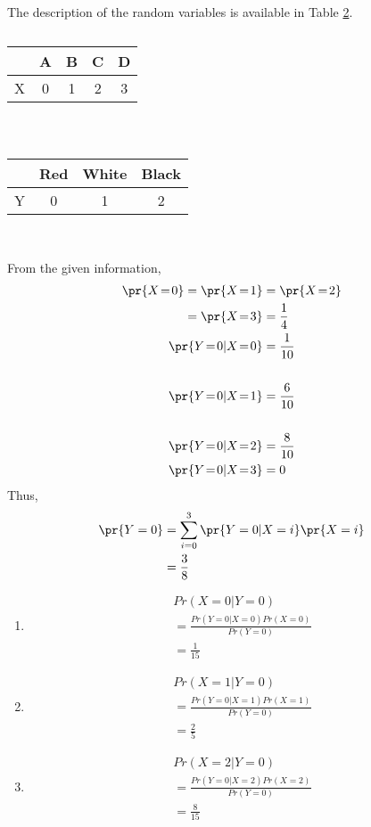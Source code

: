 The description of the random variables is available in Table \ref{table:2.2}.
\begin{table}[!ht]
\centering
\begin{tabular}{|c|c|c|c|c|}
\hline
     &A&B&C&D  \\
     \hline
     X&0&1&2&3\\
     \hline
\end{tabular}\\[5pt]
\begin{tabular}{|c|c|c|c|}
\hline
     &Red&White&Black  \\
     \hline
     Y&0&1&2\\
     \hline
\end{tabular}\\[5pt]
\caption{}
\label{table:2.2}
\end{table}
From the given information,
\begin{align}
\pr{X\!=\!0} = \pr{X\!=\!1} &= \pr{X\!=\!2} 
\\
= \pr{X\!=\!3} &= \frac{1}{4}
\\
\pr{Y\!=\!0|X\!=\!0}&=\frac{1}{10}\\
\\\pr{Y\!=\!0|X\!=\!1}&=\frac{6}{10}\\
\\\pr{Y\!=\!0|X\!=\!2}&=\frac{8}{10}\\
\pr{Y\!=\!0|X\!=\!3} &=0
\end{align}
Thus,
\begin{align}
\pr{Y=0}&= \sum_{i=0}^{3}\pr{Y=0|X=i}\pr{X=i}
\\
&=\frac{3}{8}
\end{align}
\begin{enumerate}
\item  
\begin{multline}
Pr(X=0|Y=0)
\\
=\frac{{Pr(Y=0|X=0)}{Pr(X=0)}}{{Pr(Y=0)}}
\\
=\frac{1}{15}
\end{multline}
\item 
\begin{multline}
Pr(X=1|Y=0)
\\
=\frac{{Pr(Y=0|X=1)}{Pr(X=1)}}{{Pr(Y=0)}}
\\
=\frac{2}{5}
\end{multline}
\item 
\begin{multline}
Pr(X=2|Y=0)
\\=\frac{{Pr(Y=0|X=2)}{Pr(X=2)}}{{Pr(Y=0)}}
\\
=\frac{8}{15}
\end{multline}
\end{enumerate}